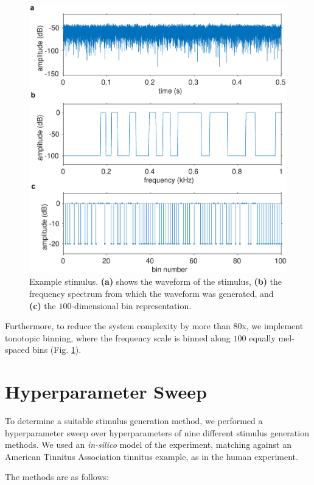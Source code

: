 \documentclass[journal]{IEEEtran}
\begin{document}
\begin{figure}[h]
	\centering
	\includegraphics[width=\linewidth]{gfx/example_stimulus.eps}
	\caption{Example stimulus. \textbf{(a)} shows the waveform of the stimulus,
  \textbf{(b)} the frequency spectrum from which the waveform was generated,
  and \textbf{(c)} the $100$-dimensional bin representation.}
	\label{fig:examplestimulus}
\end{figure}

Furthermore, to reduce the system complexity by more than 80x,
we implement tonotopic binning, where the frequency scale is binned
along $100$ equally mel-spaced bins (Fig. \ref{fig:examplestimulus}).

\section{Hyperparameter Sweep}

To determine a suitable stimulus generation method,
we performed a hyperparameter sweep over hyperparameters
of nine different stimulus generation methods.
We used an \textit{in-silico} model of the experiment,
matching against an American Tinnitus Association tinnitus example,
as in the human experiment.

The methods are as follows:
\end{document}

